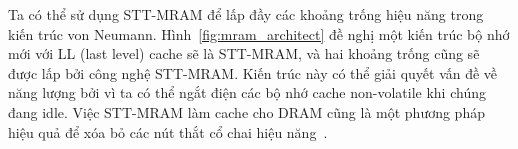 Ta có thể sử dụng STT-MRAM để lấp đầy các khoảng trống hiệu năng trong kiến
trúc von Neumann. Hình~\ref{fig:mram_architect} đề nghị một kiến trúc bộ nhớ
mới với LL (last level) cache sẽ là STT-MRAM, và hai khoảng trống cũng sẽ được
lấp bởi công nghệ STT-MRAM. Kiến trúc này có thể giải quyết vấn đề về năng
lượng bởi vì ta có thể ngắt điện các bộ nhớ cache non-volatile khi chúng đang
idle. Việc STT-MRAM làm cache cho DRAM cũng là một phương pháp hiệu quả để xóa
bỏ các nút thắt cổ chai hiệu
năng~\cite{hanyuSpintransfertorqueMagnetoresistiveRandomaccess2019}.

